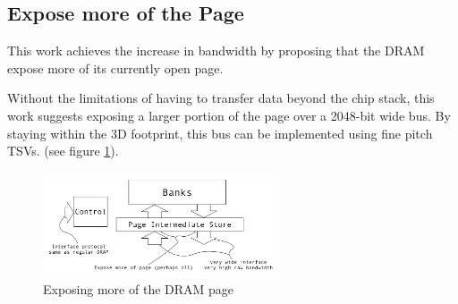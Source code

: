 \documentclass[journal]{IEEEtran}
\begin{document}

\subsection{Expose more of the Page}
\label{sec:exposeMorePage}

This work achieves the increase in bandwidth by proposing that the DRAM expose more of its currently open page.

Without the limitations of having to transfer data beyond the chip stack, this work suggests exposing a larger portion of the page over a 2048-bit wide bus. By staying within the 3D footprint, this bus can be implemented using fine pitch TSVs.
(see figure \ref{fig:dramBusChange}).

\begin{figure}[!t]
\centering
\captionsetup{justification=centering}
\captionsetup{width=.9\linewidth}
\centerline{
\mbox{\includegraphics[width=2.75in]{DRAMBusChange.jpg}}
}
\center\caption{Exposing more of the DRAM page}
\label{fig:dramBusChange}
\end{figure}
\end{document}
